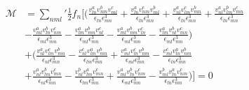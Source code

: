\documentclass[twocolumn, prx, reprint, amsfonts, amsmath, amssymb, longbibliography, floatfix, aps]{revtex4-2}
\begin{document}
\begin{equation}
	\begin{aligned}
		\mathcal{M} &= {\textstyle \sum_{nml}'} \frac{1}{2}f_n \Big[\Big( \frac{v^a_{ln}v^b_{nm}v^c_{ml}}{\epsilon_{ln}\epsilon^3_{mn}} + \frac{v^a_{ln}v^c_{nm}v^b_{ml}}{\epsilon_{ln}\epsilon^3_{mn}} +
		\frac{v^a_{nl}v^c_{lm}v^b_{mn}}{\epsilon_{ln}\epsilon^3_{mn}} +
		\frac{v^a_{nl}v^b_{lm}v^c_{mn}}{\epsilon_{ln}\epsilon^3_{mn}} \\
		& -\frac{v^a_{ml}v^b_{ln}v^c_{nm}}{\epsilon_{ml}\epsilon^3_{mn}} -\frac{v^a_{lm}v^b_{mn}v^c_{nl}}{\epsilon_{ml}\epsilon^3_{mn}}  -
		\frac{v^a_{ml}v^b_{nm}v^c_{ln}}{\epsilon_{ml}\epsilon^3_{mn}}  -
		\frac{v^a_{lm}v^b_{nl}v^c_{mn}}{\epsilon_{ml}\epsilon^3_{mn}}\Big) \\
		& + \Big(\frac{v^a_{nl}v^c_{lm}v^b_{mn}}{\epsilon_{nl}\epsilon_{mn}^3} -\frac{v^c_{nl}v^a_{lm}v^b_{mn}}{\epsilon_{lm}\epsilon_{mn}^3} 
		+\frac{v^a_{ml}v^c_{ln}v^b_{nm}}{\epsilon_{ml}\epsilon_{mn}^3} -\frac{v^c_{ml}v^a_{ln}v^b_{nm}}{\epsilon_{ln}\epsilon_{mn}^3} \\
		& + \frac{v^a_{nl}v^b_{lm}v^c_{mn}}{\epsilon_{nl}\epsilon_{mn}^3} -\frac{v^b_{nl}v^a_{lm}v^c_{mn}}{\epsilon_{lm}\epsilon_{mn}^3} 
		+\frac{v^a_{ml}v^b_{ln}v^c_{nm}}{\epsilon_{ml}\epsilon_{mn}^3} -\frac{v^b_{ml}v^a_{ln}v^c_{nm}}{\epsilon_{ln}\epsilon_{mn}^3} \Big)\Big] = 0
	\end{aligned}
\end{equation}
\end{document}
